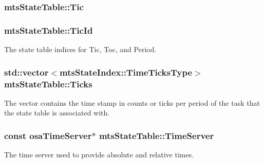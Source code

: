 \subsubsection[{Tic}]{ mts\+State\+Table\+::\+Tic}\label{classmts_state_table_ae4b2244609f4ec292d183d1daeeaf994}
\hypertarget{classmts_state_table_abf08ee55060e6fcc154161cec9a18fc1}{}
\subsubsection[{Tic\+Id}]{ mts\+State\+Table\+::\+Tic\+Id\hspace{0.3cm}{\ttfamily [protected]}}\label{classmts_state_table_abf08ee55060e6fcc154161cec9a18fc1}
The state table indices for Tic, Toc, and Period. \hypertarget{classmts_state_table_a387cab6dc638d33ded48538d13274068}{}
\subsubsection[{Ticks}]{\setlength{\rightskip}{0pt plus 5cm}std\+::vector$<${\bf mts\+State\+Index\+::\+Time\+Ticks\+Type}$>$ mts\+State\+Table\+::\+Ticks\hspace{0.3cm}{\ttfamily [protected]}}\label{classmts_state_table_a387cab6dc638d33ded48538d13274068}
The vector contains the time stamp in counts or ticks per period of the task that the state table is associated with. \hypertarget{classmts_state_table_a3d0a1bf75c293caad7ab30cd581b18e4}{}
\subsubsection[{Time\+Server}]{\setlength{\rightskip}{0pt plus 5cm}const {\bf osa\+Time\+Server}$\ast$ mts\+State\+Table\+::\+Time\+Server\hspace{0.3cm}{\ttfamily [protected]}}\label{classmts_state_table_a3d0a1bf75c293caad7ab30cd581b18e4}
The time server used to provide absolute and relative times. \hypertarget{classmts_state_table_a03193d2edccd43f42e65aaec7207708f}{}
